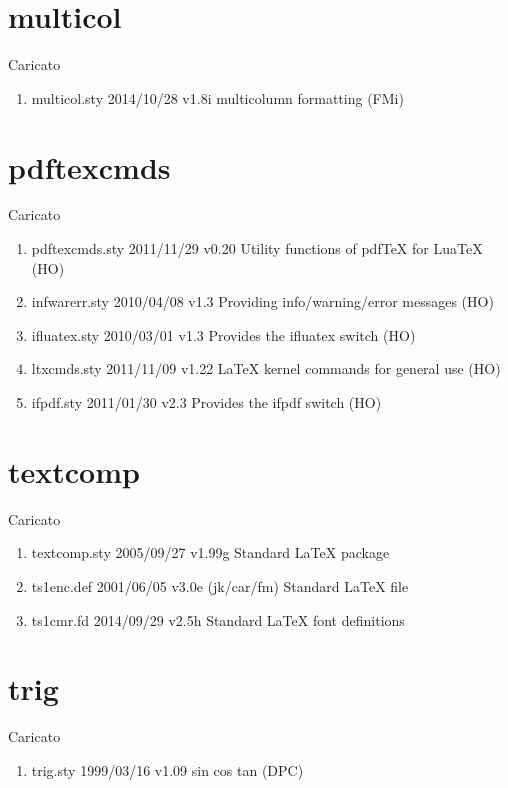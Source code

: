 \section{multicol}	 	 

Caricato 
\begin{enumerate}
\item multicol.sty 2014/10/28 v1.8i multicolumn formatting (FMi)
\end{enumerate}	
\section{pdftexcmds}	 	 

Caricato 
\begin{enumerate}
\item pdftexcmds.sty 2011/11/29 v0.20 Utility functions of pdfTeX for LuaTeX (HO)
\item infwarerr.sty 2010/04/08 v1.3 Providing info/warning/error messages (HO)
\item ifluatex.sty 2010/03/01 v1.3 Provides the ifluatex switch (HO)
\item ltxcmds.sty 2011/11/09 v1.22 LaTeX kernel commands for general use (HO)
\item ifpdf.sty 2011/01/30 v2.3 Provides the ifpdf switch (HO)
\end{enumerate}		
\section{textcomp}	 	 

Caricato 
\begin{enumerate}
\item 	textcomp.sty 2005/09/27 v1.99g Standard LaTeX package
\item 	ts1enc.def 2001/06/05 v3.0e (jk/car/fm) Standard LaTeX file
\item 	ts1cmr.fd 2014/09/29 v2.5h Standard LaTeX font definitions
\end{enumerate}	 
\section{trig}	 	 

Caricato 
\begin{enumerate}
\item trig.sty 1999/03/16 v1.09 sin cos tan (DPC)
\end{enumerate}	
